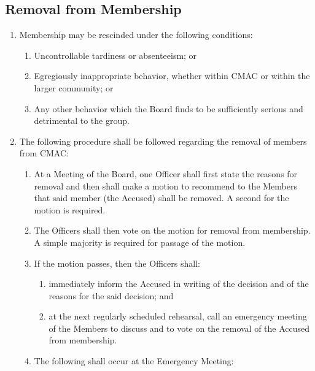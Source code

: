\documentclass{article}
\begin{document}
\subsection{Removal from Membership}
\begin{enumerate}
\item Membership may be rescinded under the following conditions:

\begin{enumerate}
\item Uncontrollable tardiness or absenteeism; or
\item Egregiously inappropriate behavior, whether within CMAC or within the
larger community; or
\item Any other behavior which the Board finds to be sufficiently serious and
  detrimental to the group.
\end{enumerate}
\item The following procedure shall be followed regarding the removal of
members from CMAC:

\begin{enumerate}
\item At a Meeting of the Board, one Officer shall first state the reasons
for removal and then shall make a motion to recommend to the Members
that said member (the Accused) shall be removed. A second for the
motion is required.
\item The Officers shall then vote on the motion for removal from membership.
A simple majority is required for passage of the motion.
\item If the motion passes, then the Officers shall:

\begin{enumerate}
\item immediately inform the Accused in writing of the decision and of
the reasons for the said decision; and
\item at the next regularly scheduled rehearsal, call an emergency meeting
of the Members to discuss and to vote on the removal of the Accused
from membership.
\end{enumerate}
\item The following shall occur at the Emergency Meeting:


\end{enumerate}
\end{enumerate}
\end{document}
